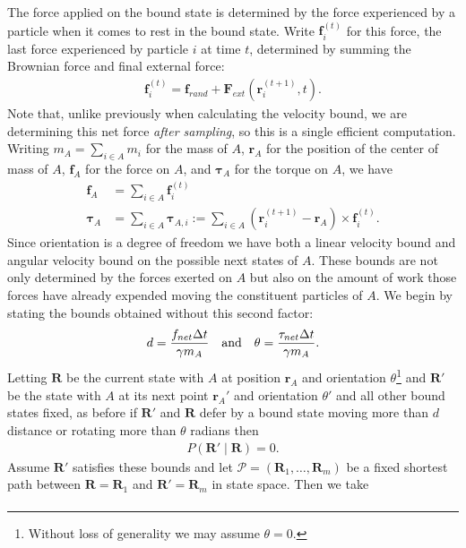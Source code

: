 \documentclass[12pt,letterpaper]{article}
\newcommand{\mb}{\mathbf}
\newcommand{\mc}{\mathcal}
\begin{document}
\begin{itemize}
The force applied on the bound state is determined by the force experienced by a particle when it comes to rest in the bound state. Write $\mb{f}^{(t)}_{i}$ for this force, the last force experienced by particle $i$ at time $t$, determined by summing the Brownian force and final external force:
\begin{align*}
\mb{f}^{(t)}_{i} = \mb{f}_{rand} + \mb{F}_{ext}(\mb{r}_{i}^{(t+1)}, t).
\end{align*}
Note that, unlike previously when calculating the velocity bound, we are determining this net force {\em after sampling}, so this is a single efficient computation. Writing $m_{A} = \sum_{i \in A}m_{i}$ for the mass of $A$, $\mb{r}_{A}$ for the position of the center of mass of $A$, $\mb{f}_{A}$ for the force on $A$, and $\boldsymbol{\tau}_{A}$ for the torque on $A$, we have
\begin{align*}
\mb{f}_{A} &= \sum_{i \in A}\mb{f}_{i}^{(t)} \\
\boldsymbol{\tau}_{A} &= \sum_{i \in A}\boldsymbol{\tau}_{A,i} := \sum_{i \in A}(\mb{r}_{i}^{(t+1)} - \mb{r}_{A}) \times \mb{f}_{i}^{(t)}.
\end{align*}
Since orientation is a degree of freedom we have both a linear velocity bound and angular velocity bound on the possible next states of $A$. These bounds are not only determined by the forces exerted on $A$ but also on the amount of work those forces have already expended moving the constituent particles of $A$. We begin by stating the bounds obtained without this second factor:
\begin{align*}
d = {f_{net}\Delta t \over \gamma m_{A}} \quad \textrm{and} \quad \theta = {\tau_{net}\Delta t \over \gamma m_{A}}.
\end{align*}
Letting $\mb{R}$ be the current state with $A$ at position $\mb{r}_{A}$ and orientation $\theta$\footnote{Without loss of generality we may assume $\theta = 0$.} and $\mb{R}'$ be the state with $A$ at its next point $\mb{r}_{A}'$ and orientation $\theta'$ and all other bound states fixed, as before if $\mb{R}'$ and $\mb{R}$ defer by a bound state moving more than $d$ distance or rotating more than $\theta$ radians then
\begin{align*}
P(\mb{R}' \mid \mb{R}) = 0.
\end{align*}
Assume $\mb{R}'$ satisfies these bounds and let $\mc{P} = (\mb{R}_{1}, \ldots, \mb{R}_{m})$ be a fixed shortest path between $\mb{R} = \mb{R}_{1}$ and $\mb{R}' = \mb{R}_{m}$ in state space. Then we take
\begin{align*}

\end{align*}
\end{itemize}
\end{document}
